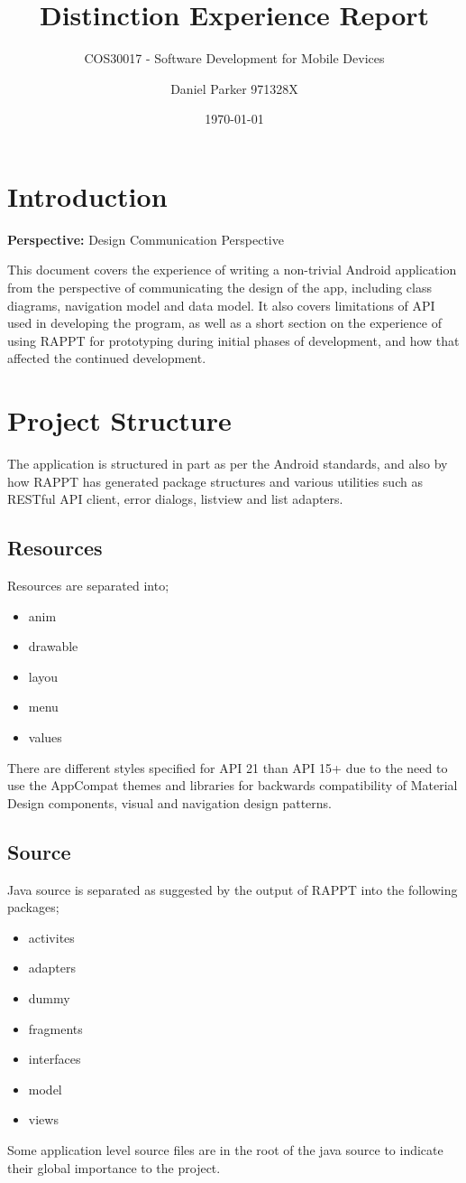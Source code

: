 \documentclass[11pt,english,numbers=endperiod,parskip=half]{scrartcl}
\title{Distinction Experience Report}
\subtitle{COS30017 - Software Development for Mobile Devices}
\author{Daniel Parker 971328X}
\date{\today}
\begin{document}
\maketitle
\thispagestyle{empty}

\section{Introduction}
  \centering
    \textbf{Perspective:} Design Communication Perspective

  \raggedright
    This document covers the experience of writing a non-trivial Android
    application from the perspective of communicating the design of the app,
    including class diagrams, navigation model and data model. It also covers
    limitations of API used in developing the program, as well as a short
    section on the experience of using RAPPT for prototyping during initial
    phases of development, and how that affected the continued development.

\section{Project Structure}
  The application is structured in part as per the Android standards, and also
  by how RAPPT has generated package structures and various utilities such as
  RESTful API client, error dialogs, listview and list adapters.

  \subsection{Resources}
    Resources are separated into;
    \begin{itemize}
      \item{anim}
      \item{drawable}
      \item{layou}
      \item{menu}
      \item{values}
    \end{itemize}
    There are different
    styles specified for API 21 than API 15+ due to the need to use the AppCompat
    themes and libraries for backwards compatibility of Material Design components,
    visual and navigation design patterns.

  \subsection{Source}
    Java source is separated as suggested by the output of RAPPT into the following
    packages;
    \begin{itemize}
      \item{activites}
      \item{adapters}
      \item{dummy}
      \item{fragments}
      \item{interfaces}
      \item{model}
      \item{views}
    \end{itemize}
    Some application level source files are in the root of the java source to
    indicate their global importance to the project.
\end{document}
